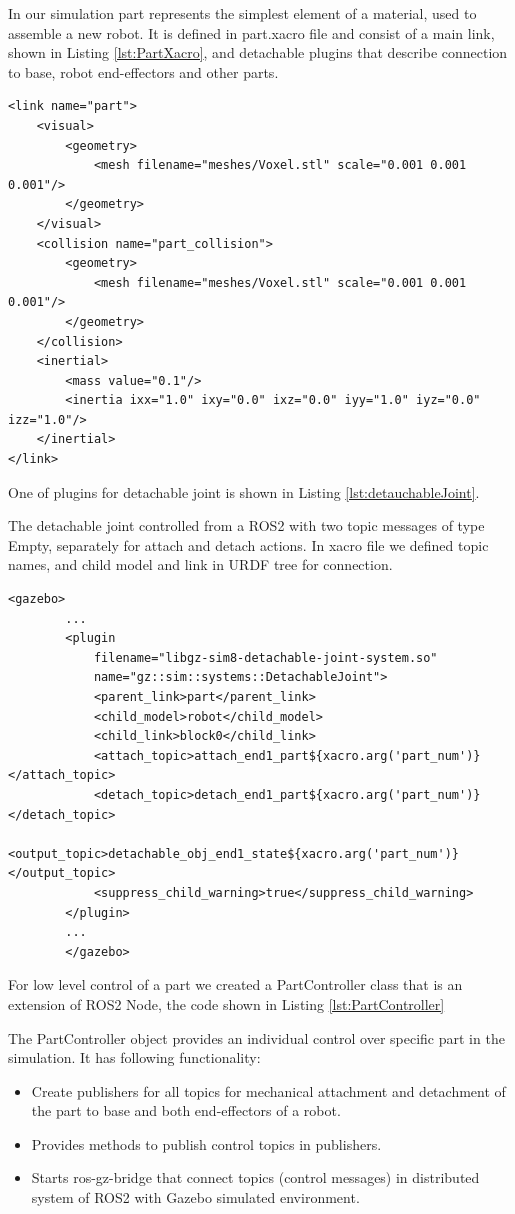 In our simulation part represents the simplest element of a material,
used to assemble a new robot.
It is defined in part.xacro file and consist of a main link, 
shown in Listing \ref{lst:PartXacro}, and detachable plugins that
describe connection to base, robot end-effectors and other parts.

\begin{lstlisting}[language=xacro,
caption={Part link code inside of part.xacro}, label={lst:PartXacro}]
<link name="part">
    <visual>
        <geometry>
            <mesh filename="meshes/Voxel.stl" scale="0.001 0.001 0.001"/>
        </geometry>
    </visual>
    <collision name="part_collision">
        <geometry>
            <mesh filename="meshes/Voxel.stl" scale="0.001 0.001 0.001"/>
        </geometry>
    </collision>
    <inertial>
        <mass value="0.1"/>
        <inertia ixx="1.0" ixy="0.0" ixz="0.0" iyy="1.0" iyz="0.0" izz="1.0"/>
    </inertial>
</link>
\end{lstlisting}

One of plugins for detachable joint is shown in Listing \ref{lst:detauchableJoint}.

The detachable joint controlled from a ROS2 with two topic messages of type Empty,
separately for attach and detach actions. 
In xacro file we defined topic names, and child model and link in URDF tree for 
connection.

\begin{lstlisting}[language=xacro,
    caption={Detachable joint example from part\.xacro}, label={lst:detauchableJoint}]
    <gazebo>
        ...
        <plugin
            filename="libgz-sim8-detachable-joint-system.so"
            name="gz::sim::systems::DetachableJoint">
            <parent_link>part</parent_link>
            <child_model>robot</child_model>
            <child_link>block0</child_link>
            <attach_topic>attach_end1_part${xacro.arg('part_num')}</attach_topic>
            <detach_topic>detach_end1_part${xacro.arg('part_num')}</detach_topic>
            <output_topic>detachable_obj_end1_state${xacro.arg('part_num')}</output_topic>
            <suppress_child_warning>true</suppress_child_warning>
        </plugin>
        ...
        </gazebo>
\end{lstlisting}


For low level control of a part we created a PartController class that is an extension 
of ROS2 Node, the code shown in Listing \ref{lst:PartController}

The PartController object provides an individual control over specific part
in the simulation. 
It has following functionality:
\begin{itemize}
    \item Create publishers for all topics for mechanical attachment and detachment 
        of the part to base and both end-effectors of a robot.
    \item Provides methods to publish control topics in publishers.
    \item Starts ros-gz-bridge that connect topics (control messages) in distributed 
        system of ROS2 with Gazebo simulated environment.
\end{itemize}

